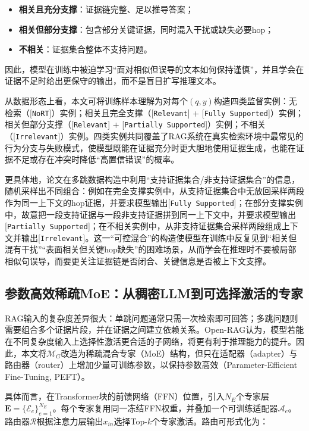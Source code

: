 \begin{itemize}
    \item \textbf{相关且充分支撑}：证据链完整、足以推导答案；
    \item \textbf{相关但部分支撑}：包含部分关键证据，同时混入干扰或缺失必要hop；
    \item \textbf{不相关}：证据集合整体不支持问题。
\end{itemize}
 
因此，模型在训练中被迫学习“面对相似但误导的文本如何保持谨慎”，并且学会在证据不足时给出更保守的输出，而不是盲目扩写推理文本。

从数据形态上看，本文可将训练样本理解为对每个$(q,y)$构造四类监督实例：无检索（[\texttt{NoRT}]）实例；相关且完全支撑（[\texttt{Relevant}] + [\texttt{Fully Supported}]）实例；相关但部分支撑（[\texttt{Relevant}] + [\texttt{Partially Supported}]）实例；不相关（[\texttt{Irrelevant}]）实例。四类实例共同覆盖了RAG系统在真实检索环境中最常见的行为分支与失败模式，使模型既能在证据充分时更大胆地使用证据生成，也能在证据不足或存在冲突时降低“高置信错误”的概率。

更具体地，论文在多跳数据构造中利用“支持证据集合/非支持证据集合”的信息，随机采样出不同组合：例如在完全支撑实例中，从支持证据集合中无放回采样两段作为同一上下文的hop证据，并要求模型输出[\texttt{Fully Supported}]；在部分支撑实例中，故意把一段支持证据与一段非支持证据拼到同一上下文中，并要求模型输出[\texttt{Partially Supported}]；在不相关实例中，从非支持证据集合采样两段组成上下文并输出[\texttt{Irrelevant}]。这一“可控混合”的构造使模型在训练中反复见到“相关但混有干扰”“表面相关但关键hop缺失”的困难场景，从而学会在推理时不要被局部相似句误导，而要更关注证据链是否闭合、关键信息是否被上下文支撑。
 
\subsection{参数高效稀疏MoE：从稠密LLM到可选择激活的专家}
RAG输入的复杂度差异很大：单跳问题通常只需一次检索即可回答；多跳问题则需要组合多个证据片段，并在证据之间建立依赖关系。Open-RAG认为，模型若能在不同复杂度输入上选择性激活更合适的子网络，将更有利于推理能力的提升。因此，本文将$\mathcal{M}_{G}$改造为稀疏混合专家（MoE）结构，但只在适配器（adapter）与路由器（router）上增加少量可训练参数，以保持参数高效（Parameter-Efficient Fine-Tuning, PEFT）。
 
具体而言，在Transformer块的前馈网络（FFN）位置，引入$N_E$个专家层$\mathbf{E}=\{\mathcal{E}_e\}_{e=1}^{N_E}$。每个专家复用同一冻结FFN权重，并叠加一个可训练适配器$\mathcal{A}_e$。路由器$\mathcal{R}$根据注意力层输出$x_{in}$选择Top-$k$个专家激活。路由可形式化为：
 
